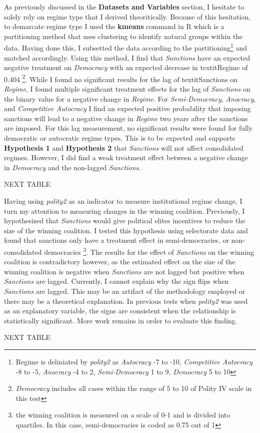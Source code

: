\documentclass[a4paper]{article}\usepackage[]{graphicx}\usepackage[]{color}
\begin{document}
As previously discussed in the \textbf{Datasets and Variables} section, I hesitate to solely rely on regime type that I derived theoritically. Because of this hesitation, to demarcate regime type I used the \textbf{kmeans} command in R which is a partitioning method that uses clustering to identify natural groups within the data. Having done this, I subsetted the data according to the partitioning\footnote{Regime is deliniated by \textit{polity2} as \textit{Autocracy} -7 to -10, \textit{Competitive Autocracy} -8 to -5, \textit{Anocracy} -4 to 2, \textit{Semi-Democracy} 1 to 9, \textit{Democracy} 5 to 10} and matched accordingly. Using this method, I find that \textit{Sanctions} have an expected negative treatment on \textit{Democracy} with an expected decrease in textit{Regime} of 0.404 \footnote{\textit{Democracy} includes all cases within the range of 5 to 10 of Polity IV scale in this test}. While I found no significant results for the lag of textit{Sanctions} on \textit{Regime}, I found multiple significant treatment effects for the lag of \textit{Sanctions} on the binary value for a negative change in \textit{Regime}. For \textit{Semi-Democracy}, \textit{Anocracy}, and \textit{Competitive Autocracy} I find an expected positive probability that imposing sanctions will lead to a negative change in \textit{Regime} two years after the sanctions are imposed. For this lag measurement, no significant results were found for fully democratic or autocratic regime types. This is to be expected and supports \textbf{Hypothesis 1} and \textbf{Hypothesis 2} that \textit{Sanctions} will not affect consolidated regimes. However, I did find a weak treatment effect between a negative change in \textit{Democracy} and the non-lagged \textit{Sanctions}.
\par
NEXT TABLE
\par
Having using \textit{polity2} as an indicator to measure institutional regime change, I turn my attention to measuring changes in the winning coalition. Previously, I hypothesized that \textit{Sanctions} would give political elites incentives to reduce the size of the winning coalition. I tested this hypothesis using selectorate data \citep{smith2005logic} and found that sanctions only have a treatment effect in semi-democracies, or non-consolidated democracies \footnote{the winning coalition is measured on a scale of 0-1 and is divided into quartiles. In this case, semi-democracies is coded as 0.75 out of 1}. The results for the effect of \textit{Sanctions} on the winning coalition is contradictory however, as the estimated effect on the size of the winning coalition is negative when \textit{Sanctions} are not lagged but positive when \textit{Sanctions} are lagged. Currently, I cannot explain why the sign flips when \textit{Sanctions} are lagged. This may be an artifact of the methodology employed or there may be a theoretical explanation. In previous tests when \textit{polity2} was used as an explanatory variable, the signs are consistent when the relationship is statistically significant. More work remains in order to evaluate this finding. 
\par
NEXT TABLE
\par
\end{document}
